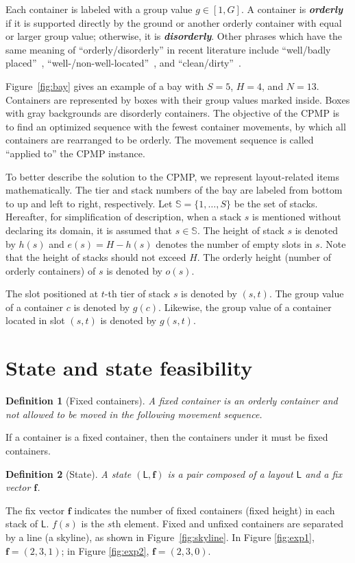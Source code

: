 \documentclass[review,3p,times,12pt,number]{elsarticle}\usepackage{amsmath}\usepackage{amssymb}
\newtheorem{definition}{Definition}
\renewcommand{\emph}[1]{\textbf{\textit{#1}}}
\begin{document}
Each container is labeled with a group value $g \in[1,G]$. A container is \emph{orderly} if it is supported directly by the ground or another orderly container with equal or larger group value; otherwise, it is \emph{disorderly}. Other phrases which have the same meaning of ``orderly{\slash}disorderly'' in recent literature include ``well{\slash}badly placed''~\citep{bort2012}, ``well-{\slash}non-well-located''~\citep{exp2012}, and ``clean{\slash}dirty''~\citep{wang2015}.

Figure~\ref{fig:bay} gives an example of a bay with $S=5$, $H=4$, and $N=13$. Containers are represented by boxes with their group values marked inside. Boxes with gray backgrounds are disorderly containers.
The objective of the CPMP is to find an optimized sequence with the fewest container movements, by which all containers are rearranged to be orderly.
The movement sequence is called ``applied to'' the CPMP instance.




To better describe the solution to the CPMP, we represent layout-related items mathematically.
The tier and stack numbers of the bay are labeled from bottom to up and left to right, respectively.
Let $\mathbb{S}=\{1,\dots,S\}$ be the set of stacks. Hereafter, for simplification of description, when a stack $s$ is mentioned without declaring its domain, it is assumed that $s\in\mathbb{S}$. The height of stack $s$ is denoted by $h(s)$ and $e(s)=H-h(s)$ denotes the number of empty slots in $s$. Note that the height of stacks should not exceed $H$.
The orderly height (number of orderly containers) of $s$ is denoted by $o(s)$.

The slot positioned at $t$-th tier of stack $s$ is denoted by $(s,t)$.
The group value of a container $c$ is denoted by $g(c)$.
Likewise, the group value of a container located in slot $(s,t)$ is denoted by $g(s,t)$.







\section{State and state feasibility}
\label{sec:state}
\begin{definition}[Fixed containers]
A fixed container is an orderly container and not allowed to be moved in the following movement sequence.
\end{definition}
If a container is a fixed container, then the containers under it must be fixed containers.
\begin{definition}[State]
A state $(\mathsf{L},\boldsymbol{f})$ is a pair composed of a layout $\mathsf{L}$ and a fix vector $\boldsymbol{f}$.
\end{definition}
The {fix} vector $\boldsymbol{f}$ indicates the number of fixed containers (fixed height) in each stack of $\mathsf{L}$.
$f(s)$ is the $s$th element. Fixed and unfixed containers are separated by a line (a skyline), as shown in Figure~\ref{fig:skyline}.
In Figure \ref{fig:exp1}, $\boldsymbol f=(2,3,1)$; in Figure \ref{fig:exp2}, $\boldsymbol f=(2,3,0)$.
\end{document}
